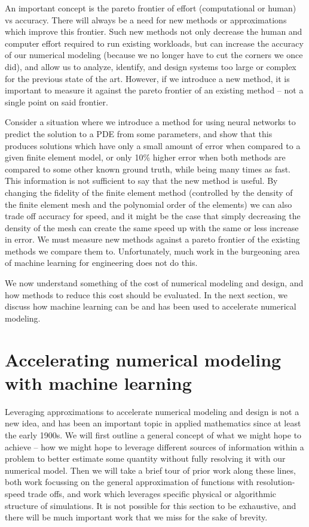 \documentclass{puthesis}
\begin{document}
An important concept is the pareto frontier of effort (computational or human) vs accuracy.
There will always be a need for new methods or approximations which improve this frontier.
Such new methods not only decrease the human and computer effort required to run existing
workloads, but can increase the accuracy of our numerical modeling (because we no longer have
to cut the corners we once did), and allow us to analyze, identify, and design systems
too large or complex for the previous state of the art.
However, if we introduce a new method, it is important to measure it against the
pareto frontier of an existing method -- not a single point on said frontier.

Consider a situation where we introduce a method for using neural networks to
predict the solution to a PDE from some parameters, and show that this produces
solutions which have only a small amount of error when compared to a given finite
element model, or only 10\% higher error when both methods are compared to some
other known ground truth, while being many
times as fast. This information is not sufficient to say that the new method is useful.
By changing the fidelity of the finite element method (controlled by the density of
the finite element mesh and the polynomial order of the elements) we can also trade off
accuracy for speed, and it might be the case that simply decreasing the density of the mesh
can create the same speed up with the same or less increase in error.
We must measure new methods against a pareto frontier of the existing methods we compare them to.
Unfortunately, much work in the burgeoning area of machine learning for engineering does
not do this.

We now understand something of the cost of numerical modeling and design, and how
methods to reduce this cost should be evaluated.
In the next section, we discuss how machine learning can be and has been used
to accelerate numerical modeling.

\section{Accelerating numerical modeling with machine learning}

Leveraging approximations to accelerate numerical modeling and design is not a new idea,
and has been an important topic in applied mathematics since at least the early 1900s.
We will first outline a general concept of what we might hope to achieve -- how we
might hope to leverage different sources of information within a problem to better
estimate some quantity without fully resolving it with our numerical model.
Then we will take a brief tour of prior work along these lines, both work focussing on
the general approximation of functions with resolution-speed trade offs, and
work which leverages specific physical or algorithmic structure of simulations.
It is not possible for this section to be exhaustive, and there will be much important
work that we miss for the sake of brevity.
\end{document}
